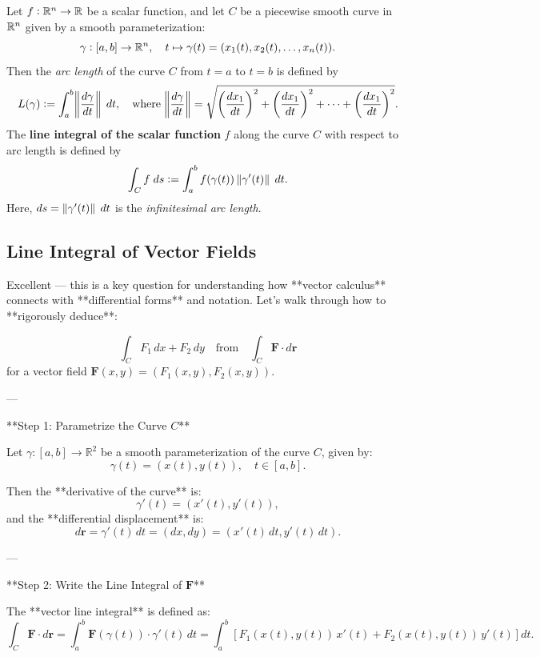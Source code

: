 \documentclass[11pt,openany]{article}
\renewcommand{\vec}[1]{\mathbf{#1}}
\begin{document}
\begin{definition*}
	Let $f:\mathbb{R}^n\to\mathbb{R}$ be a scalar function, and let $C$ be a piecewise smooth curve in 
	$\mathbb{R}^n$ given by a smooth parameterization: \[
	\gamma:[a,b]\to\mathbb{R}^n,\quad t\mapsto \gamma(t)=(x_1(t),x_2(t),\dots,x_n(t)).
	\] Then the \emph{arc length} of the curve $C$ from $t=a$ to $t=b$ is defined by \[
	L(\gamma):=\int_a^b\norm{\frac{ d\gamma}{dt}}\; dt,\quad\text{where}\; \norm{\frac{d\gamma}{dt}}=\sqrt{\left(\frac{dx_1}{dt}\right)^2+\left(\frac{dx_1}{dt}\right)^2+\cdots + \left(\frac{dx_1}{dt}\right)^2}.
	\]The \textbf{line integral of the scalar function} $f$ along the curve $C$ with respect to arc length is defined by \[
	\int_C f\; ds :=\int_a^bf(\gamma(t))\norm[0]{\gamma'(t)}\; dt.
	\] Here, $ds=\norm[0]{\gamma'(t)}\; dt$ is the \emph{infinitesimal arc length}.
\end{definition*}


\subsection*{Line Integral of Vector Fields}

Excellent — this is a key question for understanding how **vector calculus** connects with **differential forms** and notation. Let's walk through how to **rigorously deduce**:

\[
\int_C F_1\,dx + F_2\,dy
\quad \text{from} \quad
\int_C \vec{F} \cdot d\vec{r}
\]
for a vector field \( \vec{F}(x,y) = (F_1(x,y), F_2(x,y)) \).

---



 **Step 1: Parametrize the Curve \( C \)**

Let \( \gamma: [a, b] \to \mathbb{R}^2 \) be a smooth parameterization of the curve \( C \), given by:
\[
\gamma(t) = (x(t), y(t)), \quad t \in [a, b].
\]

Then the **derivative of the curve** is:
\[
\gamma'(t) = (x'(t), y'(t)),
\]
and the **differential displacement** is:
\[
d\vec{r} = \gamma'(t)\,dt = (dx, dy) = (x'(t)\,dt, y'(t)\,dt).
\]

---

 **Step 2: Write the Line Integral of \( \vec{F} \)**

The **vector line integral** is defined as:
\[
\int_C \vec{F} \cdot d\vec{r}
= \int_a^b \vec{F}(\gamma(t)) \cdot \gamma'(t)\,dt
= \int_a^b \left[ F_1(x(t), y(t))\,x'(t) + F_2(x(t), y(t))\,y'(t) \right] dt.
\]
\end{document}
